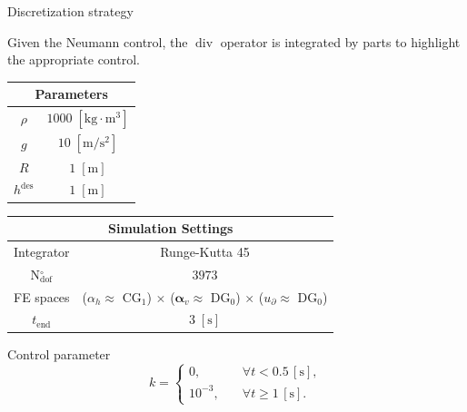 \documentclass[aspectratio=169]{ISAE-Beamer}
\renewcommand{\div}{\operatorname{div}}
\begin{document}
\begin{frame}{Discretization strategy}

Given the Neumann control, the $\div$ operator is integrated by parts to highlight the appropriate control.
\begin{table}[th]
	\centering
	\begin{tabular}{|c|c|}
		\hline 
		\multicolumn{2}{|c|}{Parameters} \\ 
		\hline 
		$\rho$ & $1000\; \mathrm{[kg \cdot m^3]}$ \\ 
		$g$& $10\; \mathrm{[m/s^2]}$ \\ 
		$R$& $1\; \mathrm{[m]}$\\ 
		$h^{\text{des}}$& $1\; \mathrm{[m]}$ \\ 
		\hline 
	\end{tabular} \hspace{.3cm}
	\begin{tabular}{|c|c|}
		\hline 
		\multicolumn{2}{|c|}{Simulation Settings} \\
		\hline 
		Integrator & Runge-Kutta 45 \\
		N$_{\text{dof}}^\circ$ & $3973$ \\
		FE spaces & ($\alpha_h\approx$ CG$_1$) $\times$ ($\bm{\alpha}_v\approx$ DG$_0$) $\times$ ($u_\partial\approx$ DG$_0$)\\
		$t_{\text{end}}$ & $3\; \mathrm{[s]}$\\ 
		\hline 
	\end{tabular} 
\end{table}
\vspace{.5cm}
Control parameter
\begin{equation*}
k = 
\begin{cases}
0, \quad &\forall t < 0.5 \, [\mathrm{s}], \\
10^{-3}, \quad &\forall t \ge 1 \, [\mathrm{s}].
\end{cases}
\end{equation*}
		
\end{frame}
\end{document}
